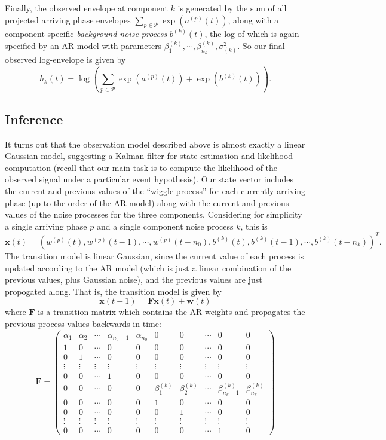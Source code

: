 \documentclass{article}
\begin{document}
Finally, the observed envelope at component $k$ is generated by the sum of all projected arriving phase envelopes $\sum_{p\in \mathcal{P}} \exp(a^{(p)}(t))$, along with a component-specific {\em background noise process} $b^{(k)}(t)$, the log of which is again specified by an AR model with parameters $\beta^{(k)}_1, \cdots, \beta^{(k)}_{n_k}, \sigma_{(k)}^2$. So our final observed log-envelope is given by
\[h_k(t) = \log \left(\sum_{p\in\mathcal{P}} \exp(a^{(p)}(t)) + \exp(b^{(k)}(t))\right).\]

\subsection{Inference}

It turns out that the observation model described above is almost exactly a linear Gaussian model, suggesting a Kalman filter for state estimation and likelihood computation (recall that our main task is to compute the likelihood of the observed signal under a particular event hypothesis). Our state vector includes the current and previous values of the ``wiggle process'' for each currently arriving phase (up to the order of the AR model) along with the current and previous values of the noise processes for the three components. Considering for simplicity a single arriving phase $p$ and a single component noise process $k$, this is
\[\mathbf{x}(t) = \left(w^{(p)}(t), w^{(p)}(t-1), \cdots, w^{(p)}(t-n_0), b^{(k)}(t), b^{(k)}(t-1), \cdots, b^{(k)}(t-n_k)\right)^T.\]
The transition model is linear Gaussian, since the current value of each process is updated according to the AR model (which is just a linear combination of the previous values, plus Gaussian noise), and the previous values are just propogated along. That is, the transition model is given by
\[\mathbf{x}(t+1) = \mathbf{F}\mathbf{x}(t) + \mathbf{w}(t)\]
where $\mathbf{F}$ is a transition matrix which contains the AR weights and propagates the previous process values backwards in time:
\[\mathbf{F} = \left(\begin{array}{cccccccccc} \alpha_1 & \alpha_2 & \cdots & \alpha_{n_0-1} & \alpha_{n_0} & 0 & 0 & \cdots & 0 & 0 \\
1 & 0 & \cdots & 0 & 0 & 0 & 0 & \cdots & 0 & 0 \\
0 & 1 & \cdots & 0 & 0 & 0 & 0 & \cdots & 0 & 0 \\
\vdots &\vdots &\vdots &\vdots &\vdots &\vdots &\vdots &\vdots &\vdots &\vdots\\
0 & 0 & \cdots & 1 & 0 & 0 & 0 & \cdots & 0 & 0 \\
0 & 0 & \cdots & 0 & 0 & \beta^{(k)}_1 & \beta^{(k)}_2 & \cdots & \beta^{(k)}_{n_k-1} & \beta^{(k)}_{n_k}\\
0 & 0 & \cdots & 0 & 0 & 1 & 0 & \cdots & 0 & 0 \\
0 & 0 & \cdots & 0 & 0 & 0 & 1 & \cdots & 0 & 0 \\
\vdots &\vdots &\vdots &\vdots &\vdots &\vdots &\vdots &\vdots &\vdots &\vdots\\
0 & 0 & \cdots & 0 & 0 & 0 & 0 & \cdots & 1 & 0
\end{array}\right)\]
\end{document}
